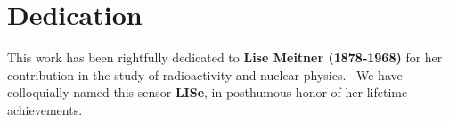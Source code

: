 \documentclass[../main.tex]{subfiles}
\begin{document}
%
    \chapter*{Dedication}%
    \begin{center}%
    This work has been rightfully dedicated to \textbf{Lise Meitner (1878-1968)} for her contribution in the study of radioactivity and nuclear physics.\ %
    We have colloquially named this sensor \textbf{LISe}, in posthumous honor of her lifetime achievements.%
    \end{center}%
    \vspace{1em}%
    \vspace{1em}%
\end{document}

